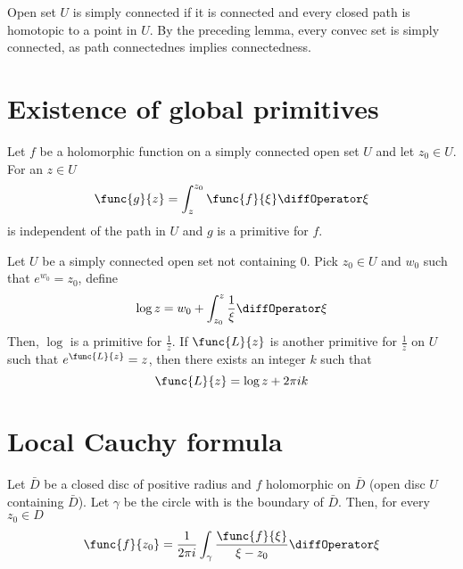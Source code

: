 Open set \(U\) is simply connected if it is connected and every closed path is homotopic to a point in \(U\). By the preceding lemma, every convec set is simply connected, as path connectednes implies connectedness.

\section{Existence of global primitives}
\begin{theorem}
    Let \(f\) be a holomorphic function on a simply connected open set \(U\) and let \(z_0 \in  U\). For an \(z \in U\)
    \begin{equation*}
        \func{g}{z} = \int_{z}^{z_0} \func{f}{\xi} \diffOperator \xi
    \end{equation*}
    is independent of the path in \(U\) and \(g\) is a primitive for \(f\).
\end{theorem}

\begin{example}
    Let \(U\) be a simply connected open set not containing \(0\). Pick \(z_0 \in U\) and \(w_0\) such that \(e^{w_0} = z_0\), define 
    \begin{equation*}
        \log z = w_0 +  \int_{z_0}^z \dfrac{1}{\xi} \diffOperator \xi
    \end{equation*}
    Then, \(\log\) is a primitive for \(\frac{1}{z}\). If \(\func{L}{z}\) is another primitive for \(\frac{1}{z}\) on \(U\) such that \(e^{\func{L}{z}}  = z\), then there exists an integer \(k\) such that 
    \begin{equation*}
        \func{L}{z} = \log z + 2\pi i k
    \end{equation*}
\end{example}

\section{Local Cauchy formula}
\begin{theorem}
    Let \(\bar{D}\) be a closed disc of positive radius and \(f\) holomorphic on \(\bar{D}\) (open disc \(U\) containing \(\bar{D}\)). Let \(\gamma\) be the circle with is the boundary of \(\bar{D}\). Then, for every \(z_0 \in D\)
    \begin{equation*}
        \func{f}{z_0} = \dfrac{1}{2\pi i} \int_{\gamma} \frac{\func{f}{\xi}}{\xi - z_0} \diffOperator \xi
    \end{equation*}
 \end{theorem}

